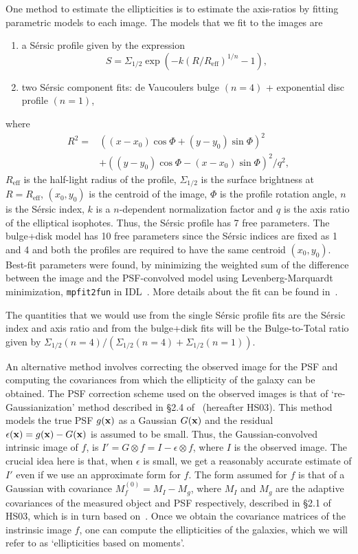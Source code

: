 \documentclass[twocolumn,useAMS,usenatbib]{mn2e}
\newcommand{\sersic}{S\'{e}rsic }
\newcommand{\btt}{Bulge-to-Total }
\begin{document}
One method to estimate the ellipticities is to estimate the axis-ratios by fitting parametric models to each image. The models that we fit to the images are
\begin{enumerate}
 \item a \sersic profile given by the expression 
       \begin{equation} 
    S = \Sigma_{1/2}\exp{\left( -k(R/R_{\text{eff}})^{1/n} -1 \right)},
       \end{equation}
       \item two \sersic component fits: de Vaucoulers bulge $(n=4)$ + exponential disc profile $(n=1)$,
\end{enumerate}
where \begin{align*} R^2 = & ((x-x_0)\cos\Phi+(y-y_0)\sin\Phi)^2  \\ & + ((y-y_0)\cos\Phi-(x-x_0)\sin\Phi)^2/q^2, \end{align*}
$R_{\text{eff}}$ is the half-light radius of the profile, $\Sigma_{1/2}$ is the surface brightness at $R=R_{\text{eff}}$, $(x_0,y_0)$ is the centroid of the image,
$\Phi$ is the profile rotation angle, $n$ is the \sersic index, $k$ is a $n$-dependent normalization factor and $q$ is the axis ratio of the elliptical isophotes.
Thus, the \sersic profile has 7 free parameters. The bulge+disk model has 10 free parameters since the \sersic indices are fixed as 1 and 4
and both the profiles are required to have the same centroid $(x_0,y_0)$. Best-fit parameters were found, by minimizing the weighted
sum of the difference between the image and the PSF-convolved model
using Levenberg-Marquardt minimization, \texttt{mpfit2fun} in IDL~\citep{mpfit2fun}. More details about the fit can be found
in~\cite{Claire_Fits}.

The quantities that we would use from the single \sersic profile fits are the \sersic index and axis ratio
and from the bulge+disk fits will be the \btt ratio given by ${\Sigma_{1/2}(n=4)}/{\left(\Sigma_{1/2}(n=4)+\Sigma_{1/2}(n=1)\right)}$.

An alternative method involves correcting the observed image for the PSF and computing the covariances from which the ellipticity of the galaxy can be obtained.
The PSF correction scheme used on the observed images is that of `re-Gaussianization' method described in \S 2.4 of~\cite{HS03} (hereafter HS03).
This method models the true PSF $g({\bf x})$ as a Gaussian $G({\bf x})$ and the residual $\epsilon({\bf x}) = g({\bf x}) - G({\bf x})$ is assumed to be small. Thus, the Gaussian-convolved
intrinsic image of $f$, is $I' = G\otimes f = I - \epsilon \otimes f$, where $I$ is the observed image. The crucial idea here is that, when $\epsilon$ is small, we get a reasonably accurate
estimate of $I'$ even if we use an approximate form for $f$. The form assumed for $f$ is that of a Gaussian with covariance $M_f^{(0)} = M_I - M_g$, where $M_I$ and $M_g$ are the adaptive
covariances of the measured object and PSF respectively, described in \S 2.1 of HS03, which is in turn based on~\cite{BJ02}. Once we obtain the covariance matrices of the instrinsic image $f$, one can compute the ellipticities 
of the galaxies, which we will refer to as `ellipticities based on moments'.
\end{document}
